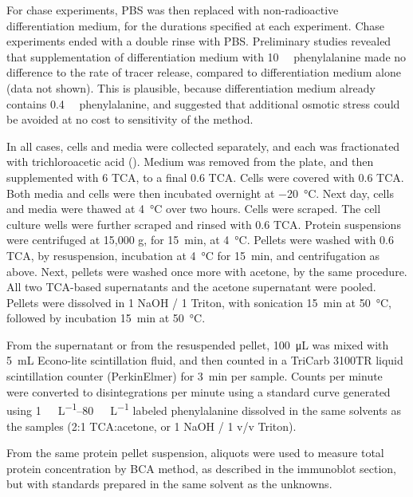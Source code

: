 \documentclass[12pt,english]{report}\usepackage[]{graphicx}\usepackage[]{color}
\begin{document}
For chase experiments, PBS was then replaced with non-radioactive
differentiation medium, for the durations specified at each experiment.
Chase experiments ended with a double rinse with PBS. Preliminary
studies revealed that supplementation of differentiation medium with
\SI{10}{\milli\molar} phenylalanine made no difference to the rate
of tracer release, compared to differentiation medium alone (data
not shown). This is plausible, because differentiation medium already
contains \SI{0.4}{\milli\molar} phenylalanine, and suggested that
additional osmotic stress could be avoided at no cost to sensitivity
of the method.

In all cases, cells and media were collected separately, and each
was fractionated with trichloroacetic acid ().
Medium was removed from the plate, and then supplemented with \SI{6}{\molar}
TCA, to a final \SI{0.6}{\molar} TCA. Cells were covered with \SI{0.6}{\molar}
TCA. Both media and cells were then incubated overnight at \SI{-20}{\celsius}.
Next day, cells and media were thawed at \SI{4}{\celsius} over two
hours. Cells were scraped. The cell culture wells were further scraped
and rinsed with \SI{0.6}{\molar} TCA. Protein suspensions were centrifuged
at 15,000 g, for \SI{15}{\minute}, at \SI{4}{\celsius}. Pellets
were washed with \SI{0.6}{\molar} TCA, by resuspension, incubation
at \SI{4}{\celsius} for \SI{15}{\minute}, and centrifugation as
above. Next, pellets were washed once more with acetone, by the same
procedure. All two TCA-based supernatants and the acetone supernatant
were pooled. Pellets were dissolved in \SI{1}{\molar} NaOH / \SI{1}{\promille}
Triton, with sonication \SI{15}{\minute} at \SI{50}{\celsius}, followed
by incubation \SI{15}{\minute} at \SI{50}{\degreeCelsius}.

From the supernatant or from the resuspended pellet, \SI{100}{\micro\liter}
was mixed with \SI{5}{\milli\liter} Econo-lite scintillation fluid,
and then counted in a TriCarb 3100TR liquid scintillation counter
(PerkinElmer) for \SI{3}{\minute} per sample. Counts per minute were
converted to disintegrations per minute using a standard curve generated
using \SIrange{1}{80}{\micro\curie\per\liter} labeled phenylalanine
dissolved in the same solvents as the samples (2:1 TCA:acetone, or
\SI{1}{\molar} NaOH / \SI{1}{\promille} v/v Triton).

From the same protein pellet suspension, aliquots were used to measure
total protein concentration by BCA method, as described in the immunoblot
section, but with standards prepared in the same solvent as the unknowns.
\end{document}
